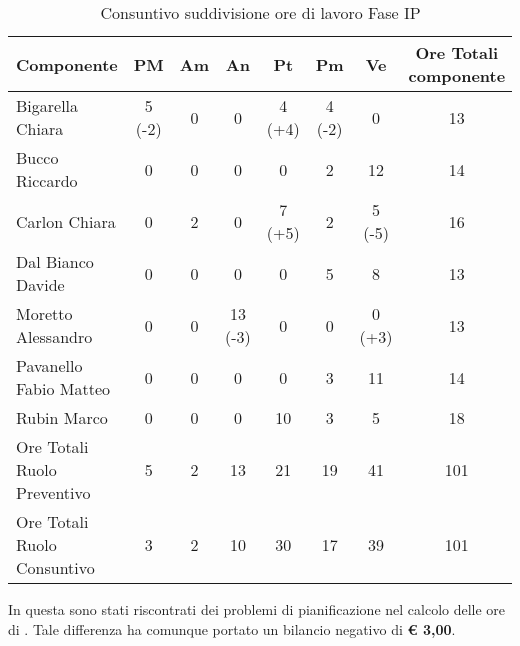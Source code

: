 			\begin{table}[H]
				\begin{center}
					\begin{tabular}{| l | c | c | c | c | c | c | c |}
						\hline
						Componente 					& PM	& Am	& An 	& Pt 		& Pm 		& Ve 	& Ore Totali componente \\ \hline
						
						Bigarella Chiara 			& 5 (-2) & 0	& 0		& 4	(+4)	& 4 (-2)	& 0		& 13 \\
						Bucco Riccardo 				& 0		& 0		& 0		& 0			& 2			& 12 	& 14 \\
						Carlon Chiara				& 0		& 2 	& 0		& 7 (+5)	& 2 		& 5 (-5) 	& 16 \\
						Dal Bianco Davide 			& 0		& 0		& 0		& 0			& 5 		& 8 	& 13 \\
						Moretto Alessandro 			& 0		& 0		& 13 (-3) & 0		& 0			& 0	(+3)	& 13 \\
						Pavanello Fabio Matteo		& 0		& 0		& 0		& 0			& 3 		&11 	& 14 \\
						Rubin Marco					& 0		& 0 	& 0		& 10 		& 3 		& 5		& 18 \\ \hline \hline
						
						Ore Totali Ruolo Preventivo & 5 	& 2 	& 13 	& 21 		& 19 		& 41 	& 101\\ 
						Ore Totali Ruolo Consuntivo & 3 	& 2 	& 10 	& 30 		& 17 		& 39 	& 101\\ \hline
					\end{tabular}
				\end{center}
				\caption{Consuntivo suddivisione ore di lavoro Fase IP}
			\end{table}

			In questa  sono stati riscontrati dei problemi di pianificazione nel calcolo delle ore di . Tale differenza ha comunque portato un bilancio negativo di \textbf{\euro{} 3,00}.
	
